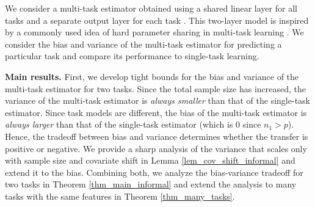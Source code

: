 
We consider a multi-task estimator obtained using a shared linear layer for all tasks and a separate output layer for each task \cite{WZR20}.
This two-layer model is inspired by a commonly used idea of hard parameter sharing in multi-task learning \cite{R17,MTDNN19}.
We consider the bias and variance of the multi-task estimator for predicting a particular task and compare its performance to single-task learning.

\textbf{Main results.} First, we develop tight bounds for the bias and variance of the multi-task estimator for two tasks.
Since the total sample size has increased, the variance of the multi-task estimator is \textit{always smaller} than that of the single-task estimator.
Since task models are different, the bias of the multi-task estimator is \textit{always larger} than that of the single-task estimator (which is $0$ since $n_1 > p$).
Hence, the tradeoff between bias and variance determines whether the transfer is positive or negative.
We provide a sharp analysis of the variance that scales only with sample size and covariate shift in Lemma \ref{lem_cov_shift_informal} and extend it to the bias.
Combining both, we analyze the bias-variance tradeoff for two tasks in Theorem \ref{thm_main_informal} and extend the analysis to many tasks with the same features in Theorem \ref{thm_many_tasks}.

